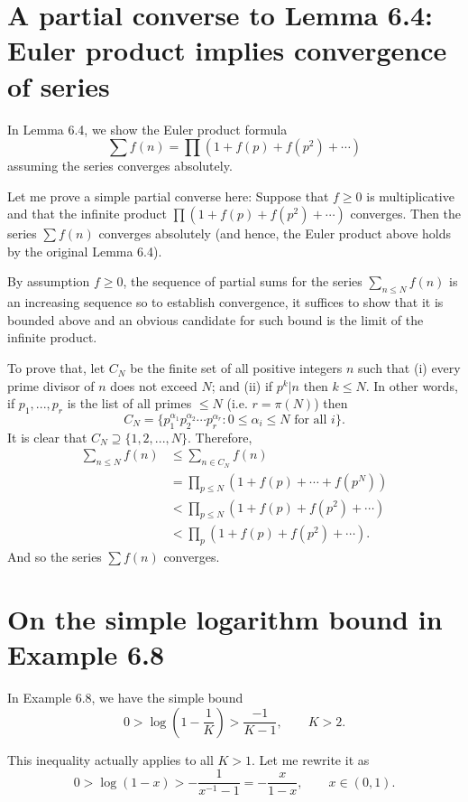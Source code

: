 \documentclass[12pt]{article}
\begin{document}
\fi

\section{A partial converse to Lemma 6.4: Euler product implies convergence of series}

In Lemma 6.4, we show the Euler product formula
$$\sum f(n) = \prod (1 + f(p) + f(p^2) + \cdots)$$
assuming the series converges absolutely.

Let me prove a simple partial converse here: Suppose that $f \geq 0$ is multiplicative and that the infinite product $\prod (1 + f(p) + f(p^2) + \cdots)$ converges. Then the series $\sum f(n)$ converges absolutely (and hence, the Euler product above holds by the original Lemma 6.4).

By assumption $f \geq 0$, the sequence of partial sums for the series $\sum_{n \leq N} f(n)$ is an increasing sequence so to establish convergence, it suffices to show that it is bounded above and an obvious candidate for such bound is the limit of the infinite product.

To prove that, let $C_N$ be the finite set of all positive integers $n$ such that (i) every prime divisor of $n$ does not exceed $N$; and (ii) if $p^k | n$ then $k \leq N$. In other words, if $p_1, ..., p_r$ is the list of all primes $\leq N$ (i.e. $r = \pi(N)$) then
$$C_N = \{p_1^{\alpha_1} p_2^{\alpha_2} \cdots p_r^{\alpha_r} : 0 \leq \alpha_i \leq N \text{ for all } i\}.$$
It is clear that $C_N \supseteq \{1, 2, ..., N\}$. Therefore,
\begin{align*}
\sum_{n \leq N} f(n) &\leq \sum_{n \in C_N} f(n) \\
&= \prod_{p \leq N} (1 + f(p) + \cdots + f(p^N)) \\
&< \prod_{p \leq N} (1 + f(p) + f(p^2) + \cdots) \\
&< \prod_p (1 + f(p) + f(p^2) + \cdots).
\end{align*}
And so the series $\sum f(n)$ converges.

\section{On the simple logarithm bound in Example 6.8}

In Example 6.8, we have the simple bound
$$0 > \log\left(1 - \frac{1}{K}\right) > \frac{-1}{K - 1}, \qquad K > 2.$$

This inequality actually applies to all $K > 1$. Let me rewrite it as
$$0 > \log(1 - x) > -\frac{1}{x^{-1} - 1} = -\frac{x}{1 - x}, \qquad x \in (0, 1).$$
\end{document}
